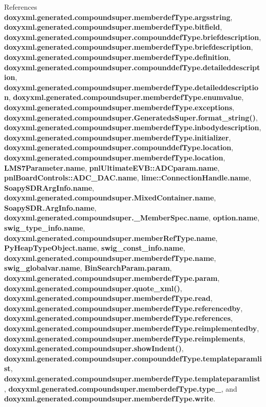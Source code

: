 References {\bf doxyxml.\+generated.\+compoundsuper.\+memberdef\+Type.\+argsstring}, {\bf doxyxml.\+generated.\+compoundsuper.\+memberdef\+Type.\+bitfield}, {\bf doxyxml.\+generated.\+compoundsuper.\+compounddef\+Type.\+briefdescription}, {\bf doxyxml.\+generated.\+compoundsuper.\+memberdef\+Type.\+briefdescription}, {\bf doxyxml.\+generated.\+compoundsuper.\+memberdef\+Type.\+definition}, {\bf doxyxml.\+generated.\+compoundsuper.\+compounddef\+Type.\+detaileddescription}, {\bf doxyxml.\+generated.\+compoundsuper.\+memberdef\+Type.\+detaileddescription}, {\bf doxyxml.\+generated.\+compoundsuper.\+memberdef\+Type.\+enumvalue}, {\bf doxyxml.\+generated.\+compoundsuper.\+memberdef\+Type.\+exceptions}, {\bf doxyxml.\+generated.\+compoundsuper.\+Generateds\+Super.\+format\+\_\+string()}, {\bf doxyxml.\+generated.\+compoundsuper.\+memberdef\+Type.\+inbodydescription}, {\bf doxyxml.\+generated.\+compoundsuper.\+memberdef\+Type.\+initializer}, {\bf doxyxml.\+generated.\+compoundsuper.\+compounddef\+Type.\+location}, {\bf doxyxml.\+generated.\+compoundsuper.\+memberdef\+Type.\+location}, {\bf L\+M\+S7\+Parameter.\+name}, {\bf pnl\+Ultimate\+E\+V\+B\+::\+A\+D\+Cparam.\+name}, {\bf pnl\+Board\+Controls\+::\+A\+D\+C\+\_\+\+D\+A\+C.\+name}, {\bf lime\+::\+Connection\+Handle.\+name}, {\bf Soapy\+S\+D\+R\+Arg\+Info.\+name}, {\bf doxyxml.\+generated.\+compoundsuper.\+Mixed\+Container.\+name}, {\bf Soapy\+S\+D\+R.\+Arg\+Info.\+name}, {\bf doxyxml.\+generated.\+compoundsuper.\+\_\+\+Member\+Spec.\+name}, {\bf option.\+name}, {\bf swig\+\_\+type\+\_\+info.\+name}, {\bf doxyxml.\+generated.\+compoundsuper.\+member\+Ref\+Type.\+name}, {\bf Py\+Heap\+Type\+Object.\+name}, {\bf swig\+\_\+const\+\_\+info.\+name}, {\bf doxyxml.\+generated.\+compoundsuper.\+memberdef\+Type.\+name}, {\bf swig\+\_\+globalvar.\+name}, {\bf Bin\+Search\+Param.\+param}, {\bf doxyxml.\+generated.\+compoundsuper.\+memberdef\+Type.\+param}, {\bf doxyxml.\+generated.\+compoundsuper.\+quote\+\_\+xml()}, {\bf doxyxml.\+generated.\+compoundsuper.\+memberdef\+Type.\+read}, {\bf doxyxml.\+generated.\+compoundsuper.\+memberdef\+Type.\+referencedby}, {\bf doxyxml.\+generated.\+compoundsuper.\+memberdef\+Type.\+references}, {\bf doxyxml.\+generated.\+compoundsuper.\+memberdef\+Type.\+reimplementedby}, {\bf doxyxml.\+generated.\+compoundsuper.\+memberdef\+Type.\+reimplements}, {\bf doxyxml.\+generated.\+compoundsuper.\+show\+Indent()}, {\bf doxyxml.\+generated.\+compoundsuper.\+compounddef\+Type.\+templateparamlist}, {\bf doxyxml.\+generated.\+compoundsuper.\+memberdef\+Type.\+templateparamlist}, {\bf doxyxml.\+generated.\+compoundsuper.\+memberdef\+Type.\+type\+\_\+}, and {\bf doxyxml.\+generated.\+compoundsuper.\+memberdef\+Type.\+write}.



